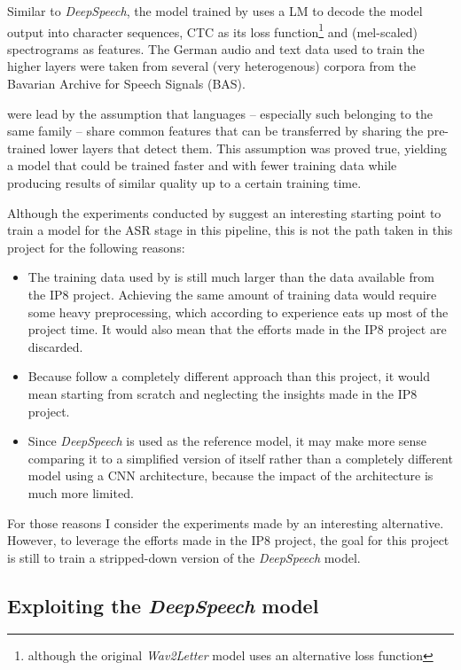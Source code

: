 Similar to \textit{DeepSpeech}, the model trained by \cite{budget} uses a \ac{LM} to decode the model output into character sequences, \ac{CTC} as its loss function\footnote{although the original \textit{Wav2Letter} model uses an alternative loss function} and (mel-scaled) spectrograms as features. The German audio and text data used to train the higher layers were taken from several (very heterogenous) corpora from the Bavarian Archive for Speech Signals (BAS). 

\cite{budget} were lead by the assumption that languages -- especially such belonging to the same family -- share common features that can be transferred by sharing the pre-trained lower layers that detect them. This assumption was proved true, yielding a model that could be trained faster and with fewer training data while producing results of similar quality up to a certain training time.

Although the experiments conducted by \cite{budget} suggest an interesting starting point to train a model for the \ac{ASR} stage in this pipeline, this is not the path taken in this project for the following reasons:

\begin{itemize}
	\item The training data used by \cite{budget} is still much larger than the data available from the IP8 project. Achieving the same amount of training data would require some heavy preprocessing, which according to experience eats up most of the project time. It would also mean that the efforts made in the IP8 project are discarded.
	\item Because \cite{budget} follow a completely different approach than this project, it would mean starting from scratch and neglecting the insights made in the IP8 project.
	\item Since \textit{DeepSpeech} is used as the reference model, it may make more sense comparing it to a simplified version of itself rather than a completely different model using a \ac{CNN} architecture, because the impact of the architecture is much more limited.
\end{itemize}

For those reasons I consider the experiments made by \cite{budget} an interesting alternative. However, to leverage the efforts made in the IP8 project, the goal for this project is still to train a stripped-down version of the \textit{DeepSpeech} model.

\subsection{Exploiting the \textit{DeepSpeech} model}

